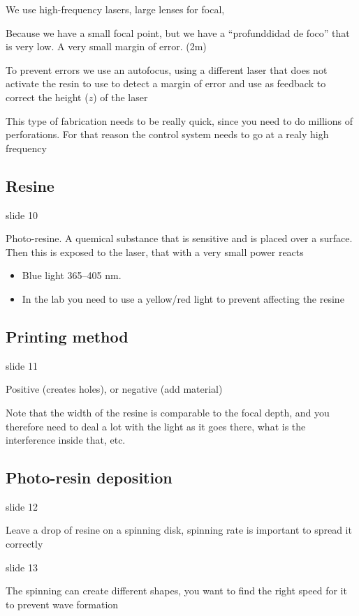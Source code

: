 \documentclass[../main/main.tex]{subfiles}
\begin{document}
We use high-frequency lasers,  large lenses for focal,

Because we have a small focal point, but we have a ``profunddidad de foco'' that is very low. A very small margin of error. (2\mu m)

To prevent errors we use an autofocus, using a different laser that does not activate the resin to use to detect a margin of error and use as feedback to correct the height ($z$) of the laser

This type of fabrication needs to be really quick, since you need to do millions of perforations. For that reason the control system needs to go at a realy high frequency


\subsection{Resine}

slide 10

Photo-resine. A quemical substance that is sensitive and is placed over a surface. Then this is exposed to the laser, that with a very small power reacts

\begin{itemize}
	\item Blue light 365--405 nm.
	\item In the lab you need to use a yellow/red light to prevent affecting the resine
\end{itemize}

\subsection{Printing method}
slide 11

Positive (creates holes), or negative (add material)

Note that the width of the resine is comparable to the focal depth, and you therefore need to deal a lot with the light as it goes there, what is the interference inside that, etc.

\subsection{Photo-resin deposition}

slide 12

Leave a drop of resine on a spinning disk, spinning rate is important to spread it correctly

slide 13

The spinning can create different shapes, you want to find the right speed for it to prevent wave formation
\end{document}
